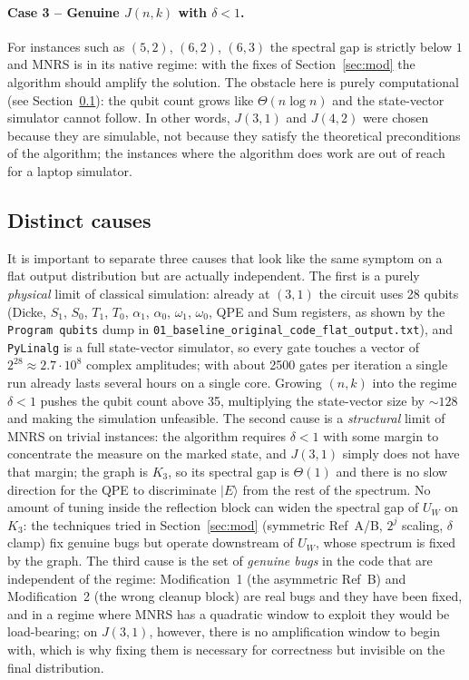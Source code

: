 \documentclass[11pt,a4paper]{article}
\begin{document}
\paragraph{Case 3 -- Genuine $J(n,k)$ with $\delta<1$.}
For instances such as $(5,2)$, $(6,2)$, $(6,3)$ the spectral gap is
strictly below $1$ and MNRS is in its native regime: with the fixes of
Section~\ref{sec:mod} the algorithm should amplify the solution. The
obstacle here is purely computational (see
Section~\ref{subsec:cause}): the qubit count grows like
$\Theta(n\log n)$ and the state-vector simulator cannot follow. In
other words, $J(3,1)$ and $J(4,2)$ were chosen because they are
simulable, not because they satisfy the theoretical preconditions of
the algorithm; the instances where the algorithm does work are out of
reach for a laptop simulator.

\subsection{Distinct causes}
\label{subsec:cause}

It is important to separate three causes that look like the same
symptom on a flat output distribution but are actually independent.
The first is a purely \emph{physical} limit of classical simulation:
already at $(3,1)$ the circuit uses 28 qubits (Dicke, $S_1$, $S_0$,
$T_1$, $T_0$, $\alpha_1$, $\alpha_0$, $\omega_1$, $\omega_0$, QPE
and Sum registers, as shown by the \texttt{Program qubits} dump in
\texttt{01\_baseline\_original\_code\_flat\_output.txt}), and
\texttt{PyLinalg} is a full state-vector
simulator, so every gate touches a vector of $2^{28}\approx 2.7\cdot
10^8$ complex amplitudes; with about 2500 gates per iteration a single
run already lasts several hours on a single core. Growing $(n,k)$ into
the regime $\delta<1$ pushes the qubit count above 35, multiplying the
state-vector size by $\sim 128$ and making the simulation unfeasible. The second cause is a \emph{structural} limit of MNRS on
trivial instances: the algorithm requires $\delta<1$ with some margin
to concentrate the measure on the marked state, and $J(3,1)$ simply
does not have that margin; the graph is $K_3$, so its spectral gap is
$\Theta(1)$ and there is no slow direction for the QPE to discriminate
$|E\rangle$ from the rest of the spectrum. No amount of tuning inside the
reflection block can widen the spectral gap of $U_W$ on $K_3$: the
techniques tried in Section~\ref{sec:mod} (symmetric Ref~A/B,
$2^j$ scaling, $\delta$ clamp) fix genuine bugs but operate
downstream of $U_W$, whose spectrum is fixed by the graph. The third cause is the set of \emph{genuine bugs} in the
code that are independent of the regime: Modification~1 (the
asymmetric Ref~B) and Modification~2 (the wrong cleanup block) are
real bugs and they have been fixed, and in a regime where MNRS has a
quadratic window to exploit they would be load-bearing; on $J(3,1)$,
however, there is no amplification window to begin with, which is why
fixing them is necessary for correctness but invisible on the final
distribution.
\end{document}
